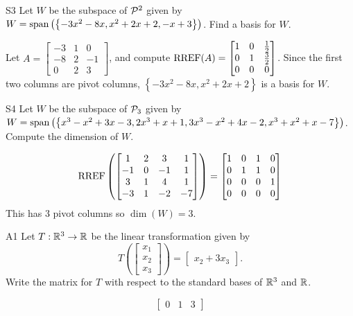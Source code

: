 \documentclass{sbgLAsemi}
\begin{document}
\begin{problem}{S3}
Let $W$ be the subspace of $\P^2$ given by $W = {\rm span} \left( \left\{  -3x^2-8x, x^2+2x+2, -x+3\right\} \right)$.   Find a basis for $W$.
\end{problem}
\begin{solution}
Let $A= \begin{bmatrix}-3 & 1 & 0 \\ -8 & 2 & -1 \\ 0 & 2 & 3\end{bmatrix}$, and compute $\RREF(A) = \begin{bmatrix} 1 & 0 & \frac{1}{2} \\ 0 & 1 & \frac{3}{2} \\ 0 & 0 & 0 \end{bmatrix}$.
Since the first two columns are pivot columns, $\left\{ -3x^2-8x, x^2+2x+2\right\} $ is a basis for $W$.
\end{solution}


\begin{problem}{S4}
Let $W$ be the subspace of $\P_3$ given by $W={\rm span}\left( \left\{ x^3-x^2+3x-3, 2x^3+x+1, 3x^3-x^2+4x-2, x^3+x^2+x-7\right\}\right)$.  Compute the dimension of $W$.
\end{problem}
\begin{solution}
$$ \RREF \left( \begin{bmatrix} 1 & 2 & 3 & 1 \\ -1 & 0 & -1 & 1 \\ 3 & 1 & 4 & 1 \\ -3 & 1 & -2 & -7 \end{bmatrix} \right) =  \begin{bmatrix} 1 & 0 & 1 & 0 \\ 0 & 1 & 1 & 0 \\ 0 & 0 & 0 & 1 \\ 0 & 0 & 0 & 0\end{bmatrix}$$
This has 3 pivot columns so $\dim(W)=3$.
\end{solution}


\begin{problem}{A1}
Let $T: \IR^3 \rightarrow \IR$ be the linear transformation given by $$T\left(\begin{bmatrix} x_1 \\ x_2 \\ x_3  \end{bmatrix} \right) = \begin{bmatrix} x_2+3x_3 \end{bmatrix}.$$ Write the matrix for $T$ with respect to the standard bases of $\IR^3$ and $\IR$.
\end{problem}
\begin{solution}
$$\begin{bmatrix} 0 & 1 & 3 \end{bmatrix}$$
\end{solution}
\end{document}
